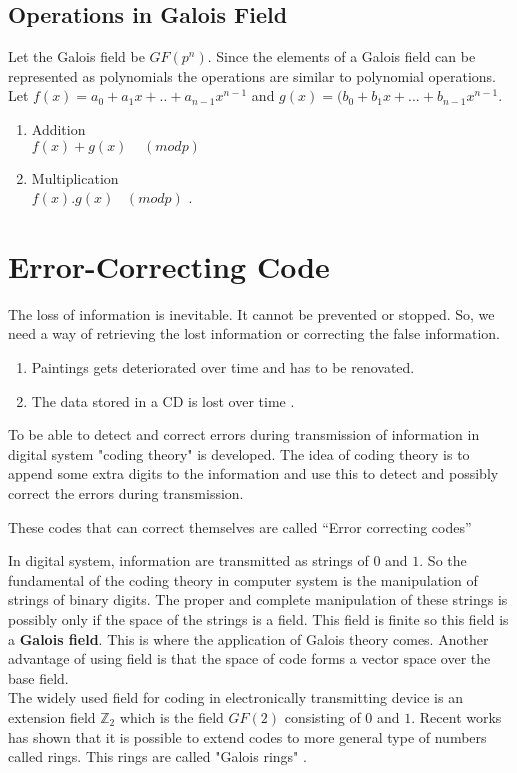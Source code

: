 \subsection{Operations in Galois Field}
Let the Galois field be \(GF(p^n)\). Since the elements of a Galois field can be represented as polynomials the operations are similar to polynomial operations. Let \(f(x)=a_0+a_1x+..+a_{n-1}x^{n-1}\) and \(g(x)=(b_0+b_1x+...+b_{n-1}x^{n-1}\).
\begin{enumerate}
  \item Addition \\
  \(f(x)+g(x)\;\;\;\; (modp)\)
  \item Multiplication \\
  \(f(x).g(x)\;\;\; (modp)\) \cite{aes}.
\end{enumerate}

\section{Error-Correcting Code}
The loss of information is inevitable. It cannot be prevented or stopped. So, we need a way of retrieving the lost information or correcting the false information.

\begin{enumerate}
\item Paintings gets deteriorated over time and has to be renovated.
\item The data stored in a CD is lost over time \cite{coding}.
\end{enumerate}

To be able to detect and correct errors during transmission of information in digital system "coding theory" is developed. The idea of coding theory is to append some extra digits to the information and use this to detect and possibly correct the errors during transmission.
\begin{definition} \cite{coding}
  These codes that can correct themselves are called ``Error correcting codes''
\end{definition}
In digital system, information are transmitted as strings of \(0\) and \(1\). So the fundamental of the coding theory in computer system is the manipulation of strings of binary digits. The proper and complete manipulation of these strings is possibly only if the space of the strings is a field. This field is finite so this field is a \textbf{Galois field}. This is where the application of Galois theory comes.
Another advantage of using field is that the space of code forms a vector space over the base field. \\
The widely used field for coding in electronically transmitting device is an extension field \({\mathbb{Z}}_2\) which is the field \(GF(2)\) consisting of \(0\) and \(1\). Recent works has shown that it is possible to extend codes to more general type of numbers called rings. This rings are called "Galois rings" \cite{error_correct}.\\

